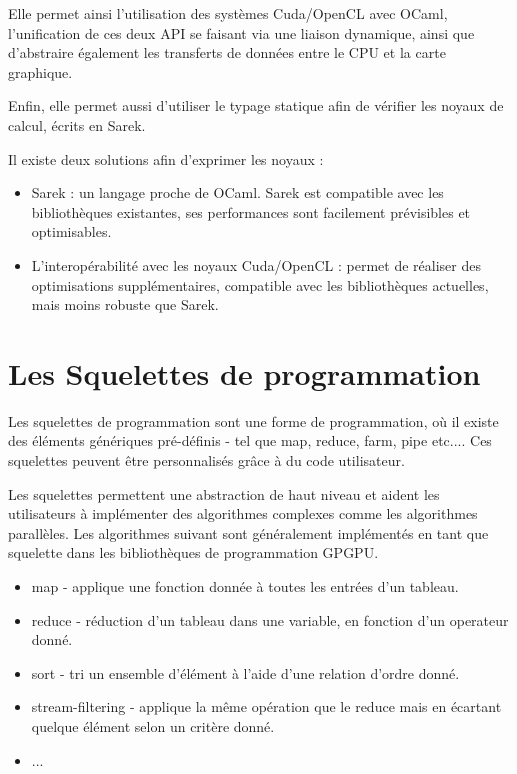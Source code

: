 \documentclass{report}
\begin{document}
Elle permet ainsi l’utilisation des systèmes Cuda/OpenCL avec OCaml, l’unification de ces deux API se faisant via une liaison dynamique, ainsi que d’abstraire également les transferts de données entre le CPU et la carte graphique.\newline

Enfin, elle permet aussi d’utiliser le typage statique afin de vérifier les noyaux de calcul, écrits en Sarek.\newline

Il existe deux solutions afin d’exprimer les noyaux :
\begin{itemize}

\item Sarek : un langage proche de OCaml. Sarek est compatible avec les bibliothèques existantes, ses performances sont facilement prévisibles et optimisables.

\item L’interopérabilité avec les noyaux Cuda/OpenCL : permet de réaliser des optimisations supplémentaires, compatible avec les bibliothèques actuelles, mais moins robuste que Sarek.


\end{itemize}


\section{Les Squelettes de programmation}
Les squelettes de programmation\cite{refSkeleton} sont une forme de programmation, où il existe des éléments génériques pré-définis - tel que map, reduce, farm, pipe etc.... Ces squelettes peuvent être personnalisés grâce à du code utilisateur.\newline

Les squelettes\cite{refSkePU} permettent une abstraction de haut niveau et aident les utilisateurs à implémenter des algorithmes complexes comme les algorithmes parallèles. Les algorithmes suivant sont généralement implémentés en tant que squelette dans les bibliothèques de programmation GPGPU.

\begin{itemize}
\item map\cite{refMap} - applique une fonction donnée à toutes les entrées d’un tableau.
\item reduce - réduction d’un tableau dans une variable, en fonction d’un operateur donné.
\item sort - tri un ensemble d’élément à l’aide d’une relation d’ordre donné.
\item stream-filtering - applique la même opération que le reduce mais en écartant quelque élément selon un critère donné.
\item ...
\end{itemize}
\end{document}
